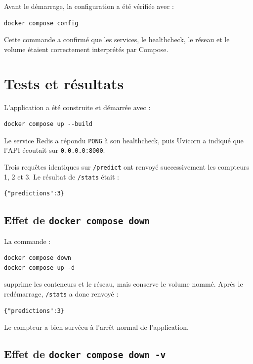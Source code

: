 \documentclass[12pt,a4paper]{article}
\begin{document}
Avant le démarrage, la configuration a été vérifiée avec :

\begin{lstlisting}
docker compose config
\end{lstlisting}

Cette commande a confirmé que les services, le healthcheck, le réseau et le
volume étaient correctement interprétés par Compose.

\section{Tests et résultats}

L'application a été construite et démarrée avec :

\begin{lstlisting}
docker compose up --build
\end{lstlisting}

Le service Redis a répondu \texttt{PONG} à son healthcheck, puis Uvicorn a
indiqué que l'API écoutait sur \texttt{0.0.0.0:8000}.

Trois requêtes identiques sur \texttt{/predict} ont renvoyé successivement les
compteurs 1, 2 et 3. Le résultat de \texttt{/stats} était :

\begin{lstlisting}
{"predictions":3}
\end{lstlisting}

\subsection{Effet de \texttt{docker compose down}}

La commande :

\begin{lstlisting}
docker compose down
docker compose up -d
\end{lstlisting}

supprime les conteneurs et le réseau, mais conserve le volume nommé. Après le
redémarrage, \texttt{/stats} a donc renvoyé :

\begin{lstlisting}
{"predictions":3}
\end{lstlisting}

Le compteur a bien survécu à l'arrêt normal de l'application.

\subsection{Effet de \texttt{docker compose down -v}}
\end{document}
